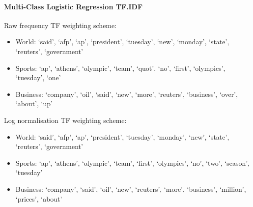 \documentclass[11pt]{article}
\begin{document}
\hypertarget{multi-class-logistic-regression-tf.idf}{%
\paragraph{Multi-Class Logistic Regression
TF.IDF}\label{multi-class-logistic-regression-tf.idf}}

Raw frequency TF weighting scheme:

\begin{itemize}
\item
  World: `said', `afp', `ap', `president', `tuesday', `new', `monday',
  `state', `reuters', `government'
\item
  Sports: `ap', `athens', `olympic', `team', `quot', `no', `first',
  `olympics', `tuesday', `one'
\item
  Business: `company', `oil', `said', `new', `more', `reuters',
  `business', `over', `about', `up'
\end{itemize}

Log normalisation TF weighting scheme:

\begin{itemize}
\item
  World: `said', `afp', `ap', `president', `tuesday', `monday', `new',
  `state', `reuters', `government'
\item
  Sports: `ap', `athens', `olympic', `team', `first', `olympics', `no',
  `two', `season', `tuesday'
\item
  Business: `company', `said', `oil', `new', `reuters', `more',
  `business', `million', `prices', `about'
\end{itemize}


\end{document}
